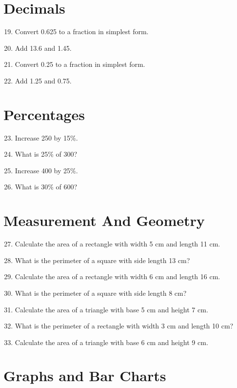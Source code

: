 \documentclass[10pt,a4paper]{article}
\begin{document}
\section*{Decimals}

\begin{enumerate}
\setcounter{enumi}{18}
\item Convert 0.625 to a fraction in simplest form.
\item Add 13.6 and 1.45.
\item Convert 0.25 to a fraction in simplest form.
\item Add 1.25 and 0.75.
\end{enumerate}

\section*{Percentages}

\begin{enumerate}
\setcounter{enumi}{22}
\item Increase 250 by 15\%.
\item What is 25\% of 300?
\item Increase 400 by 25\%.
\item What is 30\% of 600?
\end{enumerate}

\section*{Measurement And Geometry}

\begin{enumerate}
\setcounter{enumi}{26}
\item Calculate the area of a rectangle with width 5 cm and length 11 cm.
\item What is the perimeter of a square with side length 13 cm?
\item Calculate the area of a rectangle with width 6 cm and length 16 cm.
\item What is the perimeter of a square with side length 8 cm?
\item Calculate the area of a triangle with base 5 cm and height 7 cm.
\item What is the perimeter of a rectangle with width 3 cm and length 10 cm?
\item Calculate the area of a triangle with base 6 cm and height 9 cm.
\end{enumerate}

\section*{Graphs and Bar Charts}
\end{document}
